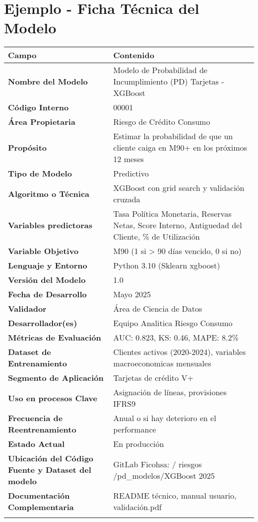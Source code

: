 \documentclass[11pt,oneside]{article}%
\begin{document}
\section{Ejemplo - Ficha Técnica del Modelo}
\begin{longtable}{>{\bfseries}p{5.3cm} p{10.7cm}}
\toprule
\rowcolor{ficoblue}
\color{white}\textbf{Campo}   &\color{white}\textbf{Contenido} \\
 \midrule
Nombre del Modelo                & Modelo de Probabilidad de Incumplimiento (PD) Tarjetas - XGBoost  \\ 
\addlinespace
Código Interno                      & 00001\\ 
\addlinespace 
Área Propietaria                    & Riesgo de Crédito Consumo \\ 
\addlinespace
Propósito                             & Estimar la probabilidad de que un cliente caiga en M90+ en los próximos 12 meses \\ 
\addlinespace
Tipo de Modelo                    & Predictivo \\ 
\addlinespace
Algoritmo o Técnica             & XGBoost con grid search y validación cruzada \\ 
\addlinespace
Variables predictoras            & Tasa Política Monetaria, Reservas Netas, Score Interno, Antiguedad del Cliente, \% de Utilización \\
\addlinespace
Variable Objetivo                 & M90 (1 si > 90 días vencido, 0 si no) \\
\addlinespace 
Lenguaje y Entorno             & Python 3.10 (Sklearn xgboost) \\ 
\addlinespace
Versión del Modelo              & 1.0 \\ 
\addlinespace 
Fecha de Desarrollo            & Mayo 2025 \\ 
\addlinespace
Validador                           & Área de Ciencia de Datos \\ 
\addlinespace
Desarrollador(es)                & Equipo Analitica Riesgo Consumo \\ 
\addlinespace
Métricas de Evaluación        & AUC: 0.823, KS: 0.46, MAPE: 8.2\% \\ 
\addlinespace
Dataset de Entrenamiento   & Clientes activos (2020-2024), variables macroeconomicas mensuales \\ 
\addlinespace
Segmento de Aplicación      & Tarjetas de crédito V+ \\ 
\addlinespace
Uso en procesos Clave        &  Asignación de líneas, provisiones IFRS9\\
\addlinespace
Frecuencia de Reentrenamiento & Anual o si hay deterioro en el performance \\ 
\addlinespace
Estado Actual                     & En producción \\ 
\addlinespace
Ubicación del Código Fuente y Dataset del modelo & GitLab Ficohsa: / riesgos /pd\_modelos/XGBoost 2025 \\
\addlinespace
Documentación Complementaria & README técnico, manual usuario, validación.pdf \\
\addlinespace 
\bottomrule
\end{longtable}
\end{document}
